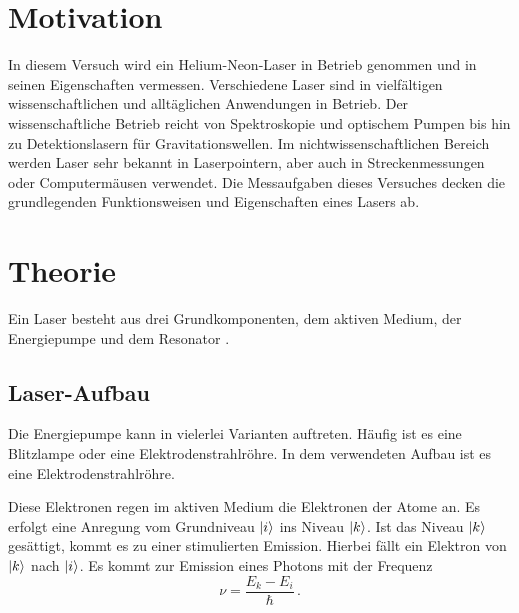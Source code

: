 \section{Motivation}
\label{sec:motivation}
In diesem Versuch wird ein Helium-Neon-Laser in Betrieb genommen und in seinen Eigenschaften vermessen.
Verschiedene Laser sind in vielfältigen wissenschaftlichen und alltäglichen Anwendungen in Betrieb.
Der wissenschaftliche Betrieb reicht von Spektroskopie und optischem Pumpen bis hin zu
Detektionslasern für Gravitationswellen.
Im nichtwissenschaftlichen Bereich werden Laser sehr bekannt in Laserpointern,
aber auch in Streckenmessungen oder Computermäusen verwendet.
Die Messaufgaben dieses Versuches decken die grundlegenden Funktionsweisen
und Eigenschaften eines Lasers ab.

\section{Theorie}
\label{sec:theorie}
Ein Laser besteht aus drei Grundkomponenten, dem aktiven Medium, der Energiepumpe und dem Resonator \cite{demtroeder}.

\subsection{Laser-Aufbau}
Die Energiepumpe kann in vielerlei Varianten auftreten.
Häufig ist es eine Blitzlampe oder eine Elektrodenstrahlröhre.
In dem verwendeten Aufbau ist es eine Elektrodenstrahlröhre.

Diese Elektronen regen im aktiven Medium die Elektronen der Atome an.
Es erfolgt eine Anregung vom Grundniveau $\lvert i\rangle$ ins Niveau $\lvert k\rangle$.
Ist das Niveau $\lvert k\rangle$ gesättigt, kommt es zu einer stimulierten Emission.
Hierbei fällt ein Elektron von $\lvert k\rangle$ nach $\lvert i\rangle$.
Es kommt zur Emission eines Photons mit der Frequenz
\begin{equation}
  ν = \frac{E_k-E_i}{\hbar}\,.
\end{equation}

